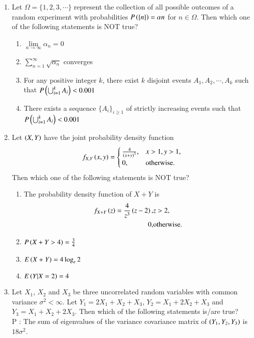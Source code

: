\documentclass[journal]{IEEEtran}
\begin{document}
\begin{enumerate}
\item Let $\Omega = \{1, 2, 3, \cdots \}$ represent the collection of all possible outcomes of a random experiment with probabilities $P\left(\{n\}\right) = \alpha n$ for $n \in \Omega$. Then which one of the following statements is NOT true?
\begin{enumerate}
    \item $\lim\limits_{n\rightarrow\infty}\alpha_n = 0$
    \item $\sum_{n=1}^{\infty}\sqrt{\alpha_n}$ converges
    \item For any positive integer $k$, there exist $k$ disjoint events $A_1, A_2, \cdots , A_k$ such that $P\left(\bigcup_{i=1}^{k}A_i\right) < 0.001$
    \item There exists a sequence $\{A_i\}_{i \geq 1}$ of strictly increasing events such that $P\left(\bigcup_{i=1}^{k}A_i\right) < 0.001$ \\
\end{enumerate}
\item Let $\left(X, Y\right)$ have the joint probability density function
\begin{align*}
    f_{X, Y}\left(x, y\right) = \begin{cases}
        \frac{4}{\left(x+y\right)^3}, & x > 1, y > 1, \\
        0, & \text{otherwise}.
    \end{cases}
\end{align*}
Then which one of the following statements is NOT true?
\begin{enumerate}
    \item The probability density function of $X + Y$ is
    \begin{align*}
        f_{X + Y}\left(z\right) = \frac{4}{z^3}\left(z - 2\right), & z > 2, \\
        0, & \text{otherwise}.
    \end{align*}
    \item $P\left(X + Y > 4\right) = \frac{3}{4}$
    \item $E\left(X + Y\right) = 4\log_{e}2$
    \item $E\left(Y | X = 2\right) = 4$ \\
\end{enumerate}
\item Let $X_1$, $X_2$ and $X_3$ be three uncorrelated random variables with common variance $\sigma^2 < \infty$. Let $Y_1 = 2X_1 + X_2 + X_3$, $Y_2 = X_1 + 2X_2 + X_3$ and $Y_3 = X_1 + X_2 + 2X_3$. Then which of the following statements is/are true? \\
P : The sum of eigenvalues of the variance covariance matrix of $\left(Y_1, Y_2, Y_3\right)$ is $18\sigma^2$. \\

\end{enumerate}
\end{document}
